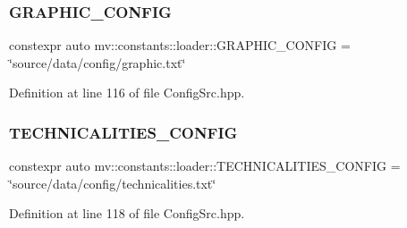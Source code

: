 \subsubsection{G\+R\+A\+P\+H\+I\+C\+\_\+\+C\+O\+N\+F\+IG}
{\footnotesize\ttfamily constexpr auto mv\+::constants\+::loader\+::\+G\+R\+A\+P\+H\+I\+C\+\_\+\+C\+O\+N\+F\+IG = \char`\"{}source/data/config/graphic.\+txt\char`\"{}}



Definition at line 116 of file Config\+Src.\+hpp.

\mbox{\label{namespacemv_1_1constants_1_1loader_ab8717ecd48f8a872a0b936d0c7f4d048}} 
\subsubsection{T\+E\+C\+H\+N\+I\+C\+A\+L\+I\+T\+I\+E\+S\+\_\+\+C\+O\+N\+F\+IG}
{\footnotesize\ttfamily constexpr auto mv\+::constants\+::loader\+::\+T\+E\+C\+H\+N\+I\+C\+A\+L\+I\+T\+I\+E\+S\+\_\+\+C\+O\+N\+F\+IG = \char`\"{}source/data/config/technicalities.\+txt\char`\"{}}



Definition at line 118 of file Config\+Src.\+hpp.

